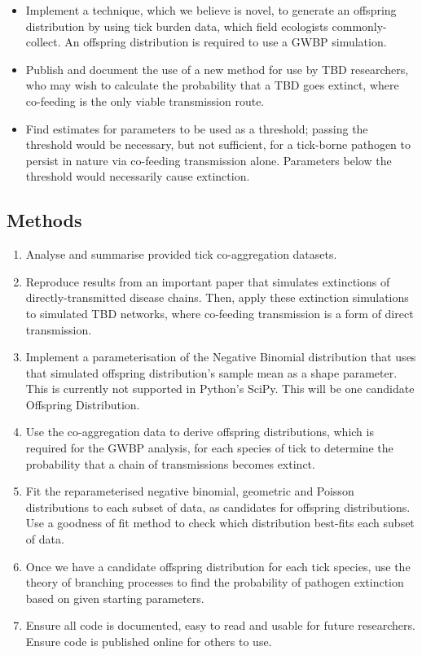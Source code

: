 \documentclass{article}
\begin{document}
\begin{itemize}
  \item Implement a technique, which we believe is novel, to generate an offspring distribution by using tick burden data, which field ecologists commonly-collect. An offspring distribution is required to use a GWBP simulation.
  \item Publish and document the use of a new method for use by TBD researchers, who may wish to calculate the probability that a TBD goes extinct, where co-feeding is the only viable transmission route.
  \item Find estimates for parameters to be used as a threshold; passing the threshold would be necessary, but not sufficient, for a tick-borne pathogen to persist in nature via co-feeding transmission alone. Parameters below the threshold would necessarily cause extinction.
\end{itemize}

\subsection{Methods}

\begin{enumerate}
  \item Analyse and summarise provided tick co-aggregation datasets. 
  \item Reproduce results from an important paper that simulates extinctions of directly-transmitted disease chains. Then, apply these extinction simulations to simulated TBD networks, where co-feeding transmission is a form of direct transmission.
  \item Implement a parameterisation of the Negative Binomial distribution that uses that simulated offspring distribution’s sample mean as a shape parameter. This is currently not supported in Python’s SciPy. This will be one candidate Offspring Distribution.
  \item Use the co-aggregation data to derive offspring distributions, which is required for the GWBP analysis, for each species of tick to determine the probability that a chain of transmissions becomes extinct.
  \item Fit the reparameterised negative binomial, geometric and Poisson distributions to each subset of data, as candidates for offspring distributions. Use a goodness of fit method to check which distribution best-fits each subset of data.
  \item Once we have a candidate offspring distribution for each tick species, use the theory of branching processes to find the probability of pathogen extinction based on given starting parameters.
  \item Ensure all code is documented, easy to read and usable for future researchers. Ensure code is published online for others to use.
\end{enumerate}
\end{document}
